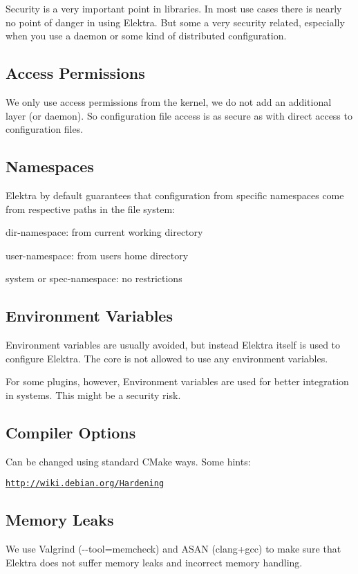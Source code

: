 Security is a very important point in libraries. In most use cases there is nearly no point of danger in using Elektra. But some a very security related, especially when you use a daemon or some kind of distributed configuration.

\subsection*{Access Permissions}

We only use access permissions from the kernel, we do not add an additional layer (or daemon). So configuration file access is as secure as with direct access to configuration files.

\subsection*{Namespaces}

Elektra by default guarantees that configuration from specific namespaces come from respective paths in the file system\+:


\begin{DoxyItemize}
\item {\ttfamily dir}-\/namespace\+: from current working directory
\item {\ttfamily user}-\/namespace\+: from users home directory
\item {\ttfamily system} or {\ttfamily spec}-\/namespace\+: no restrictions
\end{DoxyItemize}

\subsection*{Environment Variables}

Environment variables are usually avoided, but instead Elektra itself is used to configure Elektra. The core is not allowed to use any environment variables.

For some plugins, however, Environment variables are used for better integration in systems. This might be a security risk.

\subsection*{Compiler Options}

Can be changed using standard C\+Make ways. Some hints\+:

\href{http://wiki.debian.org/Hardening}{\tt http\+://wiki.\+debian.\+org/\+Hardening}

\subsection*{Memory Leaks}

We use Valgrind ({\ttfamily -\/-\/tool=memcheck}) and A\+S\+AN (clang+gcc) to make sure that Elektra does not suffer memory leaks and incorrect memory handling. 